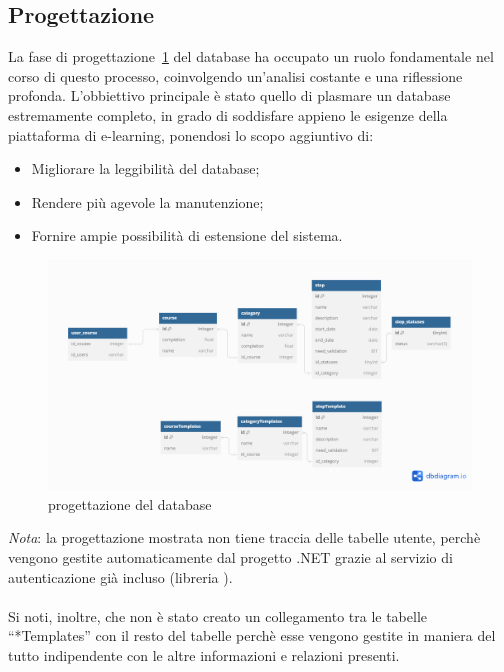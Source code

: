 \subsection{Progettazione}
La fase di progettazione~\ref{fig:one} del database ha occupato un ruolo
fondamentale nel corso di questo processo, coinvolgendo un'analisi costante e
una riflessione profonda. L'obbiettivo principale è stato quello di plasmare un
database estremamente completo, in grado di soddisfare appieno le esigenze
della piattaforma di e-learning, ponendosi lo scopo aggiuntivo di:
\begin{itemize}
	\item Migliorare la leggibilità del database;
	\item Rendere più agevole la manutenzione;
	\item Fornire ampie possibilità di estensione del sistema.
\end{itemize}
\begin{figure}[ht]
	\centering
	\includegraphics[width=1\textwidth]{img/progettazione_database.png}
	\caption{progettazione del database}
	\label{fig:one}
\end{figure}
\textit{Nota}: la progettazione mostrata non tiene traccia delle tabelle utente, perchè vengono
gestite automaticamente dal progetto .NET grazie al servizio di autenticazione già
incluso (libreria ).
%
\\ \\
Si noti, inoltre, che non è stato creato un collegamento tra le tabelle “*Templates” con il resto del tabelle
perchè esse vengono gestite in maniera del tutto indipendente con le altre informazioni e relazioni presenti.
